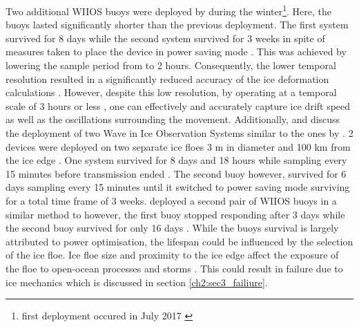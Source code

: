 Two additional WIIOS buoys were deployed by \textcite{alberello2019drift} during the winter\footnote{first deployment occured in July 2017 \cite{alberello2019drift}}. Here, the buoys lasted significantly shorter than the previous deployment. The first system survived for 8 days while the second system survived for 3 weeks in spite of measures taken to place the device in power saving mode \cite{alberello2019drift}. This was achieved by lowering the sample period from to 2 hours. Consequently, the lower temporal resolution resulted in a significantly reduced accuracy of the ice deformation calculations \cite{alberello2019drift}. However, despite this low resolution, by operating at a temporal scale of 3 hours or less \cite{alberello2019drift}, one can effectively and accurately capture ice drift speed as well as the oscillations surrounding the movement. Additionally, \textcite{vichi2019effects} and \cite{albarello2020drift} discuss the deployment of two Wave in Ice Observation Systems similar to the ones by \cite{kohout2015device}. 2 devices were deployed on two separate ice floes 3 m in diameter and 100 km from the ice edge \cite{albarello2020drift}. One system survived for 8 days and 18 hours while sampling every 15 minutes before transmission ended \cite{albarello2020drift}. The second buoy however, survived for 6 days sampling every 15 minutes until it switched to power saving mode surviving for a total time frame of 3 weeks. \textcite{vichi2019effects} deployed a second pair of WIIOS buoys in a similar method to \cite{alberello2019drift} however, the first buoy stopped responding after 3 days while the second buoy survived for only 16 days \cite{vichi2019effects}. While the buoys survival is largely attributed to power optimisation, the lifespan could be influenced by the selection of the ice floe. Ice floe size and proximity to the ice edge affect the exposure of the floe to open-ocean processes and storms \cite{vichi2019effects}. This could result in failure due to ice mechanics which is discussed in section \ref{ch2:sec3_failiure}. \par 

